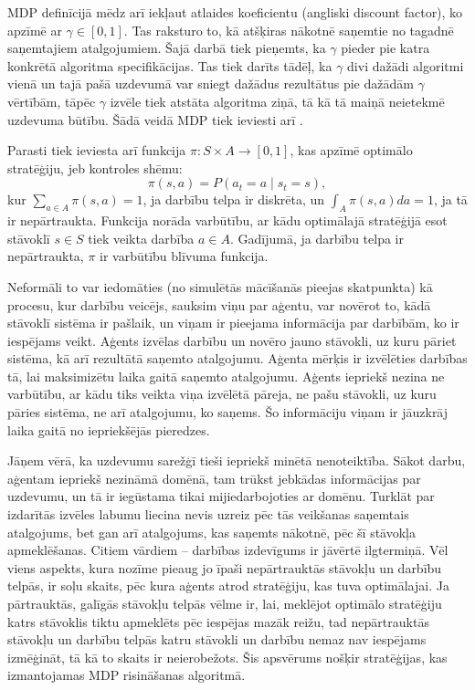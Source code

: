 \documentclass{ludis} %
\begin{document}
MDP definīcijā mēdz arī iekļaut atlaides koeficientu (angliski discount factor), ko apzīmē ar $\gamma \in [0,1]$.
Tas raksturo to, kā atšķiras nākotnē saņemtie no tagadnē saņemtajiem atalgojumiem.
Šajā darbā tiek pieņemts, ka $\gamma$ pieder pie katra konkrētā algoritma specifikācijas. %
Tas tiek darīts tādēļ, ka $\gamma$ divi dažādi algoritmi vienā un tajā pašā uzdevumā var sniegt dažādus rezultātus pie dažādām $\gamma$ vērtībām, %
tāpēc $\gamma$ izvēle tiek atstāta algoritma ziņā, tā kā tā maiņā neietekmē uzdevuma būtību. %
Šādā veidā MDP tiek ieviesti arī \autocite{Otterlo}.

Parasti tiek ieviesta arī funkcija $\pi: S \times A \rightarrow [0, 1]$, kas apzīmē optimālo stratēģiju, jeb kontroles shēmu:
\[
	\pi(s, a) = P(a_t = a \mid s_t = s),
\]
kur $\sum_{a\in A} \pi(s,a)=1$, ja darbību telpa ir diskrēta, un $\int_{A} \pi(s,a) da = 1$, ja tā ir nepārtraukta. Funkcija norāda varbūtību, ar kādu optimālajā stratēģijā esot stāvoklī $s \in S$ tiek veikta darbība $a \in A$. Gadījumā, ja darbību telpa ir nepārtraukta, $\pi$ ir varbūtību blīvuma funkcija.

Neformāli to var iedomāties (no simulētās mācīšanās pieejas skatpunkta) kā procesu, kur darbību veicējs, sauksim viņu par aģentu, var novērot to, kādā 
stāvoklī sistēma ir pašlaik, un viņam ir pieejama informācija par darbībām, ko ir iespējams veikt.
Aģents izvēlas darbību un novēro jauno stāvokli, uz kuru pāriet sistēma, kā arī rezultātā saņemto atalgojumu.
Aģenta mērķis ir izvēlēties darbības tā, lai maksimizētu laika gaitā saņemto atalgojumu.
Aģents iepriekš nezina ne varbūtību, ar kādu tiks veikta viņa izvēlētā pāreja, ne pašu stāvokli, uz kuru pāries sistēma, ne arī atalgojumu, ko saņems.
Šo informāciju viņam ir jāuzkrāj laika gaitā no iepriekšējās pieredzes.

Jāņem vērā, ka uzdevumu sarežģī tieši iepriekš minētā nenoteiktība.
Sākot darbu, aģentam iepriekš nezināmā domēnā, tam trūkst jebkādas informācijas par uzdevumu, un tā ir iegūstama tikai mijiedarbojoties ar domēnu.
Turklāt par izdarītās izvēles labumu liecina nevis uzreiz pēc tās veikšanas saņemtais atalgojums, bet gan arī atalgojums, kas saņemts nākotnē, pēc šī stāvokļa apmeklēšanas.
Citiem vārdiem -- darbības izdevīgums ir jāvērtē ilgtermiņā.
Vēl viens aspekts, kura nozīme pieaug jo īpaši nepārtrauktās stāvokļu un darbību telpās, ir soļu skaits, pēc kura aģents atrod stratēģiju, kas tuva optimālajai.
Ja pārtrauktās, galīgās stāvokļu telpās vēlme ir, lai, meklējot optimālo stratēģiju katrs stāvoklis tiktu apmeklēts pēc iespējas mazāk reižu, tad nepārtrauktās stāvokļu un darbību telpās katru stāvokli un darbību nemaz nav iespējams izmēģināt, tā kā to skaits ir neierobežots.
Šis apsvērums nošķir stratēģijas, kas izmantojamas MDP risināšanas algoritmā. %
\end{document}
